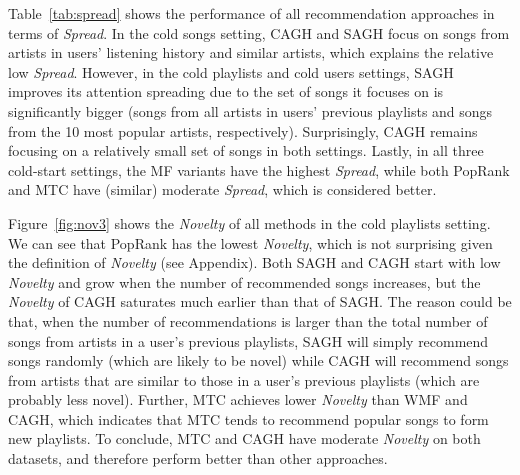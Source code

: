 Table~\ref{tab:spread} shows the performance of all recommendation approaches in terms of \emph{Spread}.
In the cold songs setting, CAGH and SAGH focus on songs from artists in users' listening history and similar artists, 
which explains the relative low \emph{Spread}.
However, in the cold playlists and cold users settings, 
SAGH improves its attention spreading due to the set of songs it focuses on is significantly bigger 
(\ie songs from all artists in users' previous playlists and songs from the 10 most popular artists, respectively).
Surprisingly, CAGH remains focusing on a relatively small set of songs in both settings.
Lastly, in all three cold-start settings, the MF variants have the highest \emph{Spread},
while both PopRank and MTC have (similar) moderate \emph{Spread},
which is considered better. %




Figure~\ref{fig:nov3} shows the \emph{Novelty} of all methods in the cold playlists setting.
We can see that PopRank has the lowest \emph{Novelty},
which is not surprising given the definition of \emph{Novelty} (see Appendix).
Both SAGH and CAGH start with low \emph{Novelty} and grow when the number of recommended songs increases,
but the \emph{Novelty} of CAGH saturates much earlier than that of SAGH.
The reason could be that,
when the number of recommendations is larger than the total number of songs from artists in a user's previous playlists,
SAGH will simply recommend songs randomly (which are likely to be novel)
while CAGH will recommend songs from artists that are similar to those in a user's previous playlists
(which are probably less novel).
Further, MTC achieves lower \emph{Novelty} than WMF and CAGH, 
which indicates that MTC tends to recommend popular songs to form new playlists. %
To conclude, 
MTC and CAGH have moderate \emph{Novelty} on both datasets,
and therefore perform better than other approaches.

